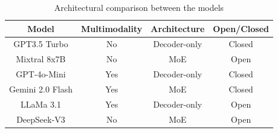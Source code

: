 \begin{table}[htbp]
    \centering
    \renewcommand{\arraystretch}{1.2}
    \begin{tabular}{|c|c|c|c|}
    \hline
    \textbf{Model} & \textbf{Multimodality} & \textbf{Architecture} & \textbf{Open/Closed} \\
    \hline
    GPT3.5 Turbo & No & Decoder-only & Closed  \\
    Mixtral 8x7B & No & MoE & Open  \\
    GPT-4o-Mini & Yes & Decoder-only & Closed  \\
    Gemini 2.0 Flash & Yes & MoE & Closed  \\
    LLaMa 3.1 & Yes & Decoder-only & Open  \\
    DeepSeek-V3 & No & MoE & Open  \\
    \hline
    \end{tabular}
    \caption{Architectural comparison between the models}
    \label{tab:confronto-modelli}
    \end{table}
